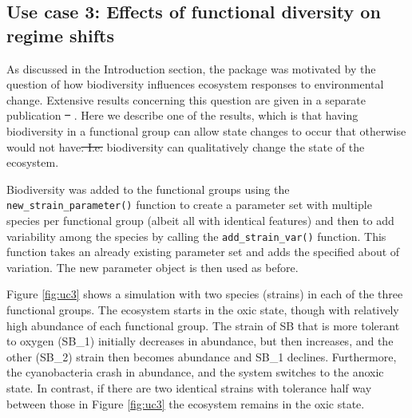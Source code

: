 \documentclass[]{elsarticle} %
\providecommand{\DIFaddtex}[1]{{\protect\color{blue}\uwave{#1}}} %
\providecommand{\DIFdeltex}[1]{{\protect\color{red}\sout{#1}}}                      %
\providecommand{\DIFaddbegin}{} %
\providecommand{\DIFaddend}{} %
\providecommand{\DIFdelbegin}{} %
\providecommand{\DIFdelend}{} %
\providecommand{\DIFadd}[1]{\texorpdfstring{\DIFaddtex{#1}}{#1}} %
\providecommand{\DIFdel}[1]{\texorpdfstring{\DIFdeltex{#1}}{}} %
\newcommand{\DIFscaledelfig}{0.5}
\newlength{\DIFdelgraphicswidth} %
\newlength{\DIFdelgraphicsheight} %
\newcommand{\DIFaddincludegraphics}[2][]{{\color{blue}\fbox{\DIFOincludegraphics[#1]{#2}}}} %
\newcommand{\DIFdelincludegraphics}[2][]{%
\sbox{\DIFdelgraphicsbox}{\DIFOincludegraphics[#1]{#2}}%
\settoboxwidth{\DIFdelgraphicswidth}{\DIFdelgraphicsbox} %
\settoboxtotalheight{\DIFdelgraphicsheight}{\DIFdelgraphicsbox} %
\scalebox{\DIFscaledelfig}{%
\parbox[b]{\DIFdelgraphicswidth}{\usebox{\DIFdelgraphicsbox}\\[-\baselineskip] \rule{\DIFdelgraphicswidth}{0em}}\llap{\resizebox{\DIFdelgraphicswidth}{\DIFdelgraphicsheight}{%
\setlength{\unitlength}{\DIFdelgraphicswidth}%
\begin{picture}(1,1)%
\thicklines\linethickness{2pt} %
{\color[rgb]{1,0,0}\put(0,0){\framebox(1,1){}}}%
{\color[rgb]{1,0,0}\put(0,0){\line( 1,1){1}}}%
{\color[rgb]{1,0,0}\put(0,1){\line(1,-1){1}}}%
\end{picture}%
}\hspace*{3pt}}} %
} %
\DeclareRobustCommand{\DIFaddbegin}{\DIFOaddbegin \let\includegraphics\DIFaddincludegraphics} %
\DeclareRobustCommand{\DIFaddend}{\DIFOaddend \let\includegraphics\DIFOincludegraphics} %
\DeclareRobustCommand{\DIFdelbegin}{\DIFOdelbegin \let\includegraphics\DIFdelincludegraphics} %
\DeclareRobustCommand{\DIFdelend}{\DIFOaddend \let\includegraphics\DIFOincludegraphics} %
\begin{document}
\hypertarget{use-case-3-effects-of-functional-diversity-on-regime-shifts}{%
\subsection{Use case 3: Effects of functional diversity on regime shifts}\label{use-case-3-effects-of-functional-diversity-on-regime-shifts}}

As discussed in the Introduction section, the package was motivated by the question of how biodiversity influences ecosystem responses to environmental change. Extensive results concerning this question are given in a separate publication \DIFdelbegin \DIFdel{\mbox{%
\citet{Limberger2022}}\hskip0pt%
}\DIFdelend \DIFaddbegin \DIFadd{\mbox{%
\citet{Limberger2023}}\hskip0pt%
}\DIFaddend . Here we describe one of the results, which is that having biodiversity in a functional group can allow state changes to occur that otherwise would not have\DIFdelbegin \DIFdel{.
I.e. }\DIFdelend \DIFaddbegin \DIFadd{, i.e.~}\DIFaddend biodiversity can qualitatively change the state of the ecosystem.

Biodiversity was added to the functional groups using the \texttt{new\_strain\_parameter()} function to create a parameter set with multiple species per functional group (albeit all with identical features) and then to add variability among the species by calling the \texttt{add\_strain\_var()} function. This function takes an already existing parameter set and adds the specified about of variation. The new parameter object is then used as before.

Figure \ref{fig:uc3} shows a simulation with two species (strains) in each of the three functional groups. The ecosystem starts in the oxic state, though with relatively high abundance of each functional group. The strain of SB that is more tolerant to oxygen (SB\_1) initially decreases in abundance, but then increases, and the other (SB\_2) strain then becomes abundance and SB\_1 declines. Furthermore, the cyanobacteria crash in abundance, and the system switches to the anoxic state. In contrast, if there are two identical strains with tolerance half way between those in Figure \ref{fig:uc3} the ecosystem remains in the oxic state.
\end{document}
